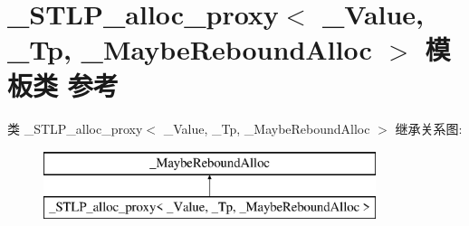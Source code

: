 \hypertarget{class___s_t_l_p__alloc__proxy}{}\section{\+\_\+\+S\+T\+L\+P\+\_\+alloc\+\_\+proxy$<$ \+\_\+\+Value, \+\_\+\+Tp, \+\_\+\+Maybe\+Rebound\+Alloc $>$ 模板类 参考}
\label{class___s_t_l_p__alloc__proxy}
类 \+\_\+\+S\+T\+L\+P\+\_\+alloc\+\_\+proxy$<$ \+\_\+\+Value, \+\_\+\+Tp, \+\_\+\+Maybe\+Rebound\+Alloc $>$ 继承关系图\+:\begin{figure}[H]
\begin{center}
\leavevmode
\includegraphics[height=2.000000cm]{class___s_t_l_p__alloc__proxy}
\end{center}
\end{figure}
